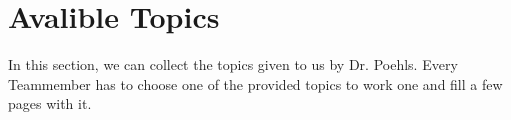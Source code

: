 \section{Avalible Topics}
In this section, we can collect the topics given to us by Dr. Poehls. Every Teammember has to choose one of the provided topics to work one and fill a few pages with it.